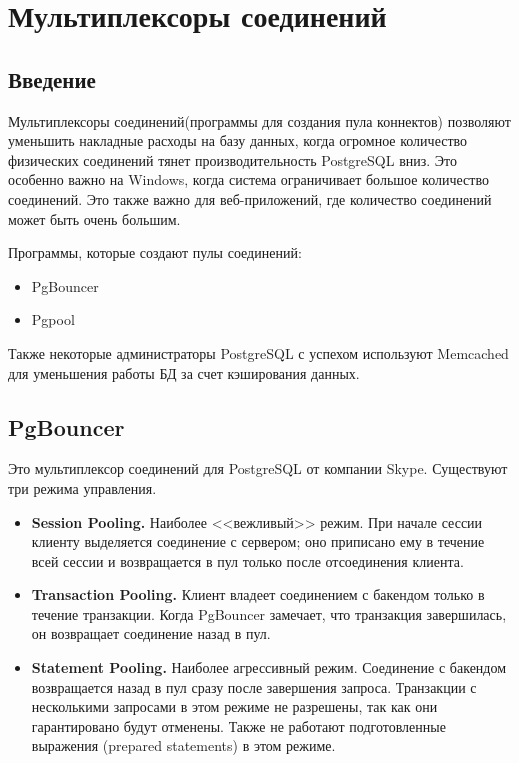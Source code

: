 \chapter{Мультиплексоры соединений}
\begin{epigraphs}
\end{epigraphs}
\section{Введение}
Мультиплексоры соединений(программы для создания пула коннектов) позволяют уменьшить накладные расходы на базу данных, 
когда огромное количество физических соединений тянет производительность PostgreSQL вниз. 
Это особенно важно на Windows, когда система ограничивает большое количество соединений. 
Это также важно для веб-приложений, где количество соединений может быть очень большим.

Программы, которые создают пулы соединений:
\begin{itemize}
\item PgBouncer
\item Pgpool
\end{itemize}

Также некоторые администраторы PostgreSQL с успехом используют Memcached для уменьшения работы БД 
за счет кэширования данных.

\section{PgBouncer}
Это мультиплексор соединений для PostgreSQL от компании Skype. Существуют три режима управления.
\begin{itemize}
\item \textbf{Session Pooling.}
Наиболее <<вежливый>> режим. При начале сессии клиенту выделяется соединение с сервером; 
оно приписано ему в течение всей сессии и возвращается в пул только после отсоединения клиента. 
\item \textbf{Transaction Pooling.} 
Клиент владеет соединением с бакендом только в течение транзакции. Когда PgBouncer замечает, 
что транзакция завершилась, он возвращает соединение назад в пул. 
\item \textbf{Statement Pooling.} 
Наиболее агрессивный режим. Соединение с бакендом возвращается назад в пул сразу после завершения 
запроса. Транзакции с несколькими запросами в этом режиме не разрешены, так как они гарантировано будут отменены.
Также не работают подготовленные выражения (prepared statements) в этом режиме.
\end{itemize}


